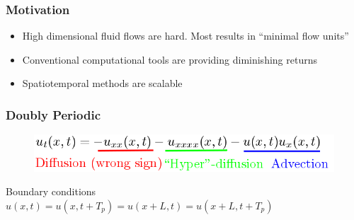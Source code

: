 \documentclass[mathserif, handout]{beamer}
\title[Spatiotemporal K-S equation ] %
{}
\subtitle{Spatiotemporal Tiling of the \KSe\, }
\author[M. Gudorf] %
{Matthew Gudorf %
}
\institute[GAtech] %
{
  Center for Nonlinear Science \\
  School of Physics \\
  Georgia Institute of Technology
}
\date[January 25th, 2019] %
{ Adviser: Predrag Cvitanovi\'c \\ \vspace{1em}
} %
\begin{document}
\frame{\titlepage} %





\begin{frame}
\frametitle{Motivation}
\begin{itemize}
\item High dimensional fluid flows are hard. Most results
in ``minimal flow units''
\item Conventional computational tools are providing diminishing returns
\item Spatiotemporal methods are scalable
\end{itemize}

\end{frame}



\begin{frame}
  \frametitle{ Doubly Periodic \KSe\ }
\begin{figure}[h]
\includegraphics[width=.8\textwidth]{MNG_annotatedks}
\end{figure}
Boundary conditions $u(x,t)=u(x,t+T_p)=u(x+L,t)=u(x+L,t+T_p)$
\end{frame}
\end{document}
